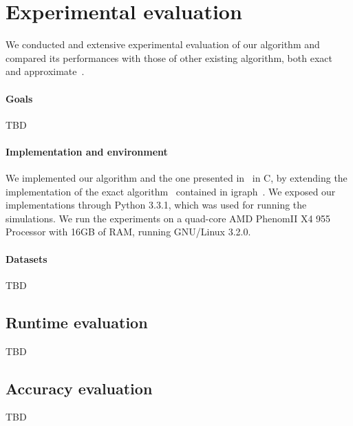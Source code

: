 \section{Experimental evaluation}\label{sec:exper}
We conducted and extensive experimental evaluation of our algorithm and
compared its performances with those of other existing algorithm, both
exact~\citep{Brandes01} and approximate~\citep{BrandesP08,JakobKLPT05}.

\paragraph{Goals} TBD

\paragraph{Implementation and environment}
We implemented our algorithm and the one presented
in~\citep{BrandesP08,JakobKLPT05} in C, by extending the implementation of the
exact algorithm~\citep{Brandes01} contained in igraph~\citep{igraph}. We
exposed our implementations through Python 3.3.1, which was used for running the
simulations. We run the experiments on a quad-core AMD Phenom\texttrademark II
X4 955 Processor with 16GB of RAM, running GNU/Linux 3.2.0.

\paragraph{Datasets} TBD

\subsection{Runtime evaluation}\label{sec:runtime}
TBD

\subsection{Accuracy evaluation}\label{sec:accuracy}
TBD
